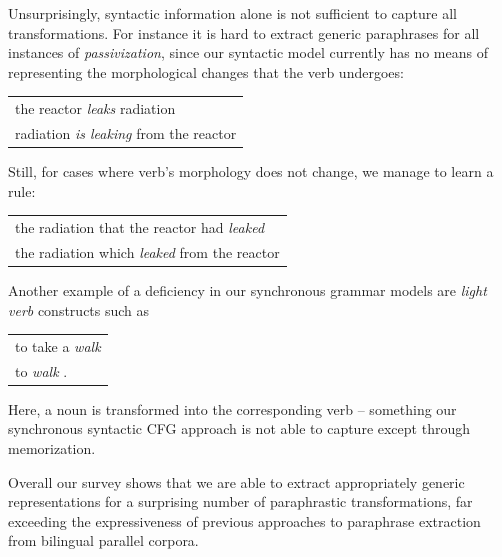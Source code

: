 \documentclass[11pt]{article}
\begin{document}
Unsurprisingly, syntactic information alone is not sufficient to
capture all transformations. For instance it is hard to extract
generic paraphrases for all instances of \emph{passivization}, since our syntactic
model currently has no means of representing the morphological changes that the
verb undergoes:
\begin{center}
\begin{tabular}{l}
  the reactor \emph{leaks} radiation \\
  radiation \emph{is leaking} from the reactor\\
\end{tabular}

\end{center}
Still, for cases where verb's morphology does not change, we manage to
learn a rule:
\begin{center}
\begin{tabular}{l}
the radiation that the reactor had \emph{leaked} \\
the radiation which \emph{leaked} from the reactor \\
\end{tabular}
\end{center}
%
Another example of a deficiency in our synchronous grammar models are
\emph{light verb} constructs such as
\begin{center}
\begin{tabular}{l}
  to take a \emph{walk} \\
  to \emph{walk} .
\end{tabular}
\end{center}
Here, a noun is transformed into the corresponding verb -- something
our synchronous syntactic CFG approach is not able to capture except
through memorization.

Overall our survey shows that we are able to extract appropriately generic
representations for a surprising number of paraphrastic
transformations, far exceeding the expressiveness of previous
approaches to paraphrase extraction from bilingual parallel corpora.



\end{document}
